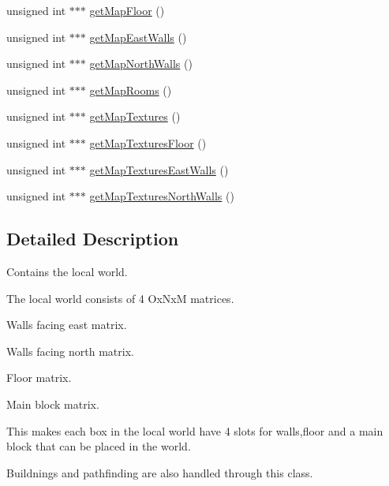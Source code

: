 \begin{DoxyCompactItemize}
\item 
unsigned int $\ast$$\ast$$\ast$ \hyperlink{classShipMap_a5ab9f1b8d8a8efb91dbc1555ddd835da}{get\-Map\-Floor} ()
\item 
unsigned int $\ast$$\ast$$\ast$ \hyperlink{classShipMap_a2272771cebf1ad7459d87108bcce9fa8}{get\-Map\-East\-Walls} ()
\item 
unsigned int $\ast$$\ast$$\ast$ \hyperlink{classShipMap_a85804cf36ce82bbcc1722732deaea2f5}{get\-Map\-North\-Walls} ()
\item 
unsigned int $\ast$$\ast$$\ast$ \hyperlink{classShipMap_a96d0a84da234e73df2d0a44531da71e7}{get\-Map\-Rooms} ()
\item 
unsigned int $\ast$$\ast$$\ast$ \hyperlink{classShipMap_a4de11bdb01a85083627dc41016967bce}{get\-Map\-Textures} ()
\item 
unsigned int $\ast$$\ast$$\ast$ \hyperlink{classShipMap_a3701cc7e75f89719e2c137203b3ada7f}{get\-Map\-Textures\-Floor} ()
\item 
unsigned int $\ast$$\ast$$\ast$ \hyperlink{classShipMap_a6b16ec5869e5cb347d847c975b3fd01f}{get\-Map\-Textures\-East\-Walls} ()
\item 
unsigned int $\ast$$\ast$$\ast$ \hyperlink{classShipMap_aecdbc1ca649c823dc139aefcce416ebb}{get\-Map\-Textures\-North\-Walls} ()
\end{DoxyCompactItemize}


\subsection{Detailed Description}
Contains the local world. 

The local world consists of 4 Ox\-Nx\-M matrices.
\begin{DoxyEnumerate}
\item Walls facing east matrix.
\item Walls facing north matrix.
\item Floor matrix.
\item Main block matrix.
\end{DoxyEnumerate}

This makes each box in the local world have 4 slots for walls,floor and a main block that can be placed in the world.

Buildnings and pathfinding are also handled through this class. 

